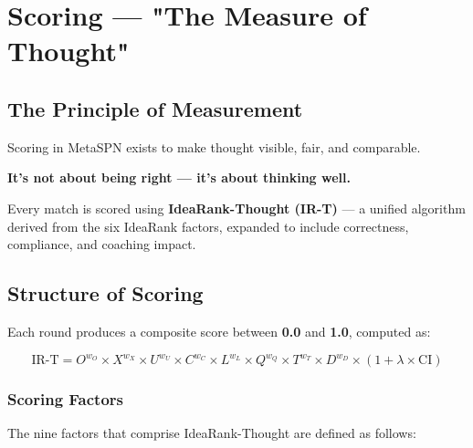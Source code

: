 \chapter{Scoring — "The Measure of Thought"}
\label{ch:scoring}

\section{The Principle of Measurement}

Scoring in MetaSPN exists to make thought visible, fair, and comparable.

\begin{principle}
\textbf{It's not about being right — it's about thinking well.}
\end{principle}

Every match is scored using \textbf{IdeaRank-Thought (IR-T)} — a unified algorithm derived from the six IdeaRank factors, expanded to include correctness, compliance, and coaching impact.

\section{Structure of Scoring}

Each round produces a composite score between \textbf{0.0} and \textbf{1.0}, computed as:

\begin{equation}
\text{IR-T} = O^{w_O} \times X^{w_X} \times U^{w_U} \times C^{w_C} \times L^{w_L} \times Q^{w_Q} \times T^{w_T} \times D^{w_D} \times (1 + \lambda \times \text{CI})
\end{equation}

\subsection{Scoring Factors}

The nine factors that comprise IdeaRank-Thought are defined as follows:

